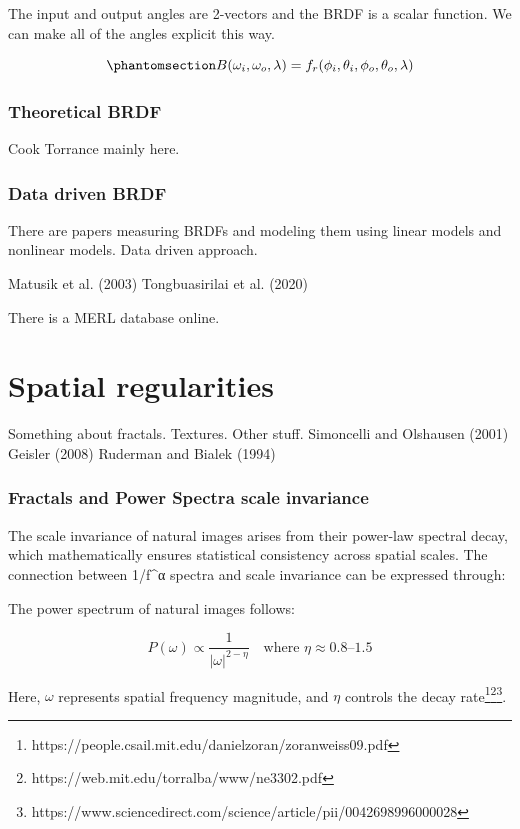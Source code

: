 \documentclass[
  letterpaper,
]{book}
\begin{document}
The input and output angles are 2-vectors and the BRDF is a scalar
function. We can make all of the angles explicit this way.

\begin{equation}\phantomsection\label{eq-BRDF2}{
B(\omega_i, \omega_o, \lambda) = f_r(\phi_i,\theta_i,\phi_o,\theta_o,\lambda)
}\end{equation}

\subsection{Theoretical BRDF}\label{theoretical-brdf}

Cook Torrance mainly here.

\subsection{Data driven BRDF}\label{data-driven-brdf}

There are papers measuring BRDFs and modeling them using linear models
and nonlinear models. Data driven approach.

Matusik et al. (2003) Tongbuasirilai et al. (2020)

There is a MERL database online.

\chapter{Spatial regularities}\label{spatial-regularities}

Something about fractals. Textures. Other stuff. Simoncelli and
Olshausen (2001) Geisler (2008) Ruderman and Bialek (1994)

\subsection{Fractals and Power Spectra scale
invariance}\label{fractals-and-power-spectra-scale-invariance}

The scale invariance of natural images arises from their power-law
spectral decay, which mathematically ensures statistical consistency
across spatial scales. The connection between 1/f\^{}α spectra and scale
invariance can be expressed through:

The power spectrum of natural images follows:

\[
P(\omega) \propto \frac{1}{|\omega|^{2-\eta}} \quad \text{where } \eta \approx 0.8\text{--}1.5
\]

Here, \(\omega\) represents spatial frequency magnitude, and \(\eta\)
controls the decay rate\footnote{https://people.csail.mit.edu/danielzoran/zoranweiss09.pdf}\footnote{https://web.mit.edu/torralba/www/ne3302.pdf}\footnote{https://www.sciencedirect.com/science/article/pii/0042698996000028}.
\end{document}
